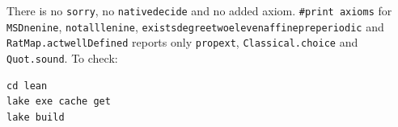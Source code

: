 \documentclass[11pt]{article}
\theoremstyle{definition}
\theoremstyle{remark}
\renewcommand{\_}{\oldus\allowbreak}
\begin{document}
There is no \texttt{sorry}, no \texttt{native\_decide} and no added axiom. \texttt{\#print axioms} for
\texttt{MSD\_ne\_nine}, \texttt{not\_all\_le\_nine}, \texttt{exists\_degree\_two\_eleven\_affine\_preperiodic}
and \texttt{RatMap.act\_wellDefined} reports only \texttt{propext}, \texttt{Classical.choice} and
\texttt{Quot.sound}. To check:
\begin{verbatim}
cd lean
lake exe cache get
lake build
\end{verbatim}
\end{document}
